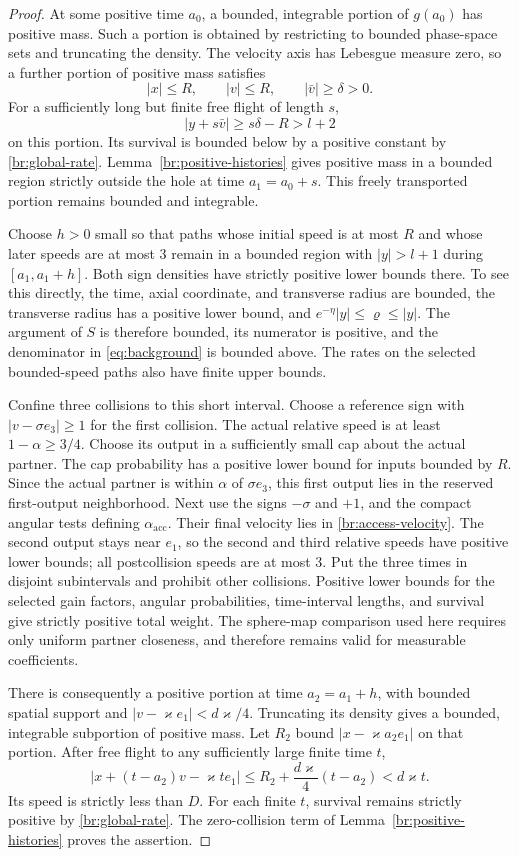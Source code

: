 \begin{proof}
At some positive time \(a_0\), a bounded, integrable portion of
\(g(a_0)\) has positive mass. Such a portion is obtained by restricting
to bounded phase-space sets and truncating the density. The velocity axis has Lebesgue measure zero, so a
further portion of positive mass satisfies
\[
|x|\le R,\qquad |v|\le R,\qquad |\bar v|\ge\delta>0.
\]
For a sufficiently long but finite free flight of length \(s\),
\[
|y+s\bar v|\ge s\delta-R>l+2
\]
on this portion. Its survival is bounded below by a positive constant
by \eqref{br:global-rate}. Lemma~\ref{br:positive-histories} gives
positive mass in a bounded region strictly outside the hole at
time \(a_1=a_0+s\). This freely transported portion remains bounded
and integrable.

Choose \(h>0\) small so that paths whose initial speed is at most
\(R\) and whose later speeds are at most 3 remain in a bounded region
with \(|y|>l+1\) during \([a_1,a_1+h]\). Both sign densities have
strictly positive lower bounds there. To see this directly, the time,
axial coordinate, and transverse radius are bounded, the transverse
radius has a positive lower bound, and
\(e^{-\eta}|y|\le\varrho\le|y|\). The argument of \(S\) is therefore
bounded, its numerator is positive, and the denominator in
\eqref{eq:background} is bounded above. The rates on the selected
bounded-speed paths also have finite upper bounds.

Confine three collisions to this short interval. Choose a reference
sign with \(|v-\sigma e_3|\ge1\) for the first collision. The actual
relative speed is at least \(1-\alpha\ge3/4\).
Choose its output in a sufficiently small cap about the actual
partner. The cap probability has a positive lower bound for inputs
bounded by \(R\). Since the actual partner is within \(\alpha\) of
\(\sigma e_3\), this first output lies in the reserved first-output
neighborhood. Next use the signs \(-\sigma\) and \(+1\), and the
compact angular tests defining \(\alpha_{\mathrm{acc}}\). Their final
velocity lies in \eqref{br:access-velocity}. The second output stays
near \(e_1\), so the second and third relative speeds have positive
lower bounds; all postcollision speeds are at most 3.
Put the three times in disjoint subintervals and prohibit other
collisions. Positive lower bounds for the selected gain factors,
angular probabilities, time-interval lengths, and survival give
strictly positive total weight. The sphere-map comparison used here
requires only uniform partner closeness, and therefore remains valid
for measurable coefficients.

There is consequently a positive portion at time \(a_2=a_1+h\), with
bounded spatial support and \(|v-\varkappa e_1|<d\varkappa/4\).
Truncating its density gives a bounded, integrable subportion of
positive mass.
Let \(R_2\) bound \(|x-\varkappa a_2e_1|\) on that portion.
After free flight to any sufficiently large finite time \(t\),
\[
|x+(t-a_2)v-\varkappa te_1|
\le R_2+\frac{d\varkappa}{4}(t-a_2)<d\varkappa t.
\]
Its speed is strictly less than \(D\). For each finite \(t\), survival
remains strictly positive by \eqref{br:global-rate}. The zero-collision
term of Lemma~\ref{br:positive-histories} proves the assertion.
\end{proof}

